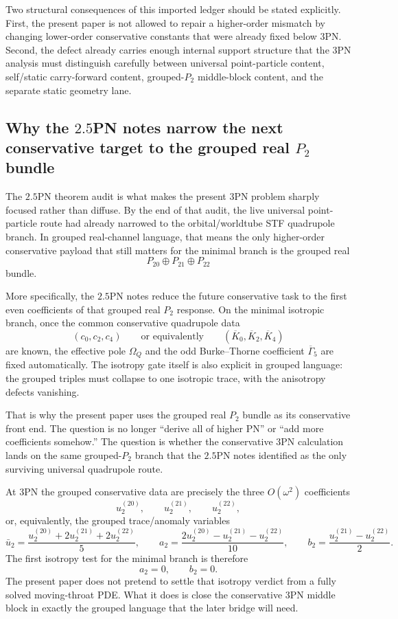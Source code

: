 \documentclass[11pt]{article}
\begin{document}
Two structural consequences of this imported ledger should be stated explicitly.
First, the present paper is not allowed to repair a higher-order mismatch by
changing lower-order conservative constants that were already fixed below $3$PN.
Second, the defect already carries enough internal support structure that the
$3$PN analysis must distinguish carefully between universal point-particle
content, self/static carry-forward content, grouped-$P_2$ middle-block content,
and the separate static geometry lane.

\subsection{Why the \texorpdfstring{$2.5$}{2.5}PN notes narrow the next conservative target to the grouped real \texorpdfstring{$P_2$}{P 2} bundle}
\label{sec:dict-25pn-bridge}

The $2.5$PN theorem audit is what makes the present $3$PN problem sharply
focused rather than diffuse.  By the end of that audit, the live universal
point-particle route had already narrowed to the orbital/worldtube STF
quadrupole branch.  In grouped real-channel language, that means the only
higher-order conservative payload that still matters for the minimal branch is
the grouped real
\[
P_{20}\oplus P_{21}\oplus P_{22}
\]
bundle.

More specifically, the $2.5$PN notes reduce the future conservative task to the
first even coefficients of that grouped real $P_2$ response.  On the minimal
isotropic branch, once the common conservative quadrupole data
\[
(c_0,c_2,c_4)
\qquad\text{or equivalently}\qquad
(\overline K_0,\overline K_2,\overline K_4)
\]
are known, the effective pole $\Omega_Q$ and the odd Burke--Thorne coefficient
$\overline\Gamma_5$ are fixed automatically.  The isotropy gate itself is also
explicit in grouped language: the grouped triples must collapse to one isotropic
trace, with the anisotropy defects vanishing.

That is why the present paper uses the grouped real $P_2$ bundle as its
conservative front end.  The question is no longer ``derive all of higher PN''
or ``add more coefficients somehow.''  The question is whether the conservative
$3$PN calculation lands on the same grouped-$P_2$ branch that the $2.5$PN notes
identified as the only surviving universal quadrupole route.

At $3$PN the grouped conservative data are precisely the three $O(\omega^2)$
coefficients
\[
u_2^{(20)},\qquad u_2^{(21)},\qquad u_2^{(22)},
\]
or, equivalently, the grouped trace/anomaly variables
\[
\bar u_2=\frac{u_2^{(20)}+2u_2^{(21)}+2u_2^{(22)}}{5},
\qquad
 a_2=\frac{2u_2^{(20)}-u_2^{(21)}-u_2^{(22)}}{10},
\qquad
 b_2=\frac{u_2^{(21)}-u_2^{(22)}}{2}.
\]
The first isotropy test for the minimal branch is therefore
\[
a_2=0,
\qquad
b_2=0.
\]
The present paper does not pretend to settle that isotropy verdict from a fully
solved moving-throat PDE.  What it does is close the conservative $3$PN middle
block in exactly the grouped language that the later bridge will need.
\end{document}
